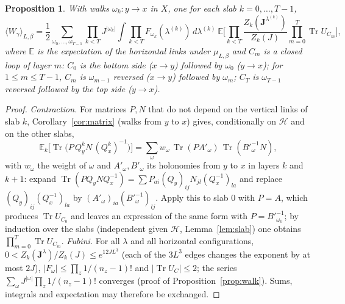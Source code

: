 \documentclass[11pt,a4paper]{article}
\theoremstyle{plain}
\newtheorem{proposition}[theorem]{Proposition}
\theoremstyle{remark}
\numberwithin{equation}{section}
\newcommand{\E}{\mathbb{E}}
\newcommand{\Tr}{\operatorname{Tr}}
\newcommand{\cH}{\mathcal{H}}
\newcommand{\bs}{\boldsymbol}
\begin{document}
\begin{proposition}\label{prop:loop}
With walks $\omega_k:y\to x$ in $X$, one for each slab $k=0,\dots,T-1$,
\begin{equation}\label{eq:loop}
\langle W_\gamma\rangle_{L,\beta}=\frac12\sum_{\omega_0,\dots,\omega_{T-1}}\prod_{k<T}J^{|\omega_k|}\int\prod_{k<T}
F_{\omega_k}(\lambda^{(k)})\,d\lambda^{(k)}\ \E\Big[\prod_{k<T}\frac{Z_k(\bs J^{\lambda^{(k)}})}{Z_k(J)}\prod_{m=0}^{T}\Tr U_{C_m}\Big],
\end{equation}
where $\E$ is the expectation of the horizontal links under $\mu_{L,\beta}$ and $C_m$ is a closed loop of layer $m$: $C_0$ is the
bottom side ($x\to y$) followed by $\omega_0$ ($y\to x$); for $1\le m\le T-1$, $C_m$ is $\omega_{m-1}$ reversed ($x\to y$) followed by
$\omega_m$; $C_T$ is $\omega_{T-1}$ reversed followed by the top side ($y\to x$).
\end{proposition}
\begin{proof}
\emph{Contraction.} For matrices $P,N$ that do not depend on the vertical links of slab $k$, Corollary~\ref{cor:matrix} (walks from
$y$ to $x$) gives, conditionally on $\cH$ and on the other slabs,
\[
\E_k\big[\Tr\big(P\,Q^k_yN\,(Q^k_x)^{-1}\big)\big]=\sum_\omega w_\omega\,\Tr(PA'_\omega)\,\Tr(B'^{-1}_\omega N),
\]
with $w_\omega$ the weight of $\omega$ and $A'_\omega,B'_\omega$ its holonomies from $y$ to $x$ in layers $k$ and $k+1$: expand
$\Tr(PQ_yNQ_x^{-1})=\sum P_{ai}(Q_y)_{ij}N_{jl}(Q_x^{-1})_{la}$ and replace $(Q_y)_{ij}(Q_x^{-1})_{la}$ by
$(A'_\omega)_{ia}(B'^{-1}_\omega)_{lj}$. Apply this to slab $0$ with $P=A$, which produces
$\Tr U_{C_0}$ and leaves an expression of the same form with $P=B'^{-1}_{\omega_0}$; by induction over the slabs (independent given
$\cH$, Lemma~\ref{lem:slab}) one obtains $\prod_{m=0}^T\Tr U_{C_m}$.
\emph{Fubini.} For all $\lambda$ and all horizontal configurations, $0<Z_k(\bs J^\lambda)/Z_k(J)\le e^{12JL^3}$ (each of the $3L^3$
edges changes the exponent by at most $2J$), $|F_\omega|\le\prod_z1/(n_z-1)!$ and $|\Tr U_C|\le2$; the series
$\sum_\omega J^{|\omega|}\prod_z1/(n_z-1)!$ converges (proof of Proposition~\ref{prop:walk}). Sums, integrals and expectation may
therefore be exchanged.
\end{proof}
\end{document}
